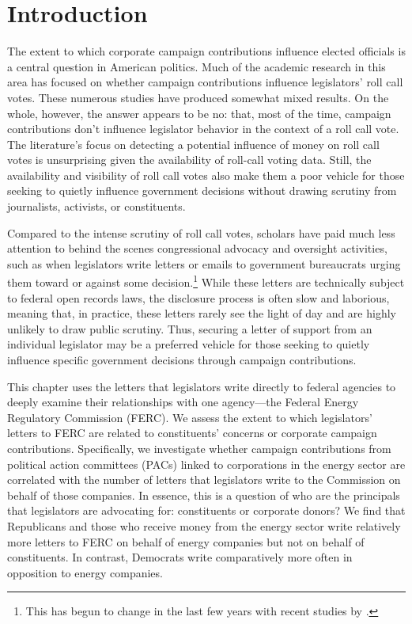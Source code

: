 \documentclass{article}
\begin{document}
\newpage
\doublespacing
\section{Introduction}

The extent to which corporate campaign contributions influence elected officials is a central question in American politics.  Much of the academic research in this area has focused on whether campaign contributions influence legislators' roll call votes.  These numerous studies have produced somewhat mixed results. On the whole, however, the answer appears to be no: that, most of the time, campaign contributions don't influence legislator behavior in the context of a roll call vote. The literature's focus on detecting a potential influence of money on roll call votes is unsurprising given the availability of roll-call voting data. Still, the availability and visibility of roll call votes also make them a poor vehicle for those seeking to quietly influence government decisions without drawing scrutiny from journalists, activists, or constituents. 

Compared to the intense scrutiny of roll call votes, scholars have paid much less attention to behind the scenes congressional advocacy and oversight activities, such as when legislators write letters or emails to government bureaucrats urging them toward or against some decision.\footnote{This has begun to change in the last few years with recent studies by  \citet{MillsKalafHuges2015, Ritchie2017, Lowande2018JOP, LowandeRitchieLauterbach2018, JudgeLordGrimmerPowell2018}.} While these letters are technically subject to federal open records laws, the disclosure process is often slow and laborious, meaning that, in practice, these letters rarely see the light of day and are highly unlikely to draw public scrutiny. Thus, securing a letter of support from an individual legislator may be a preferred vehicle for those seeking to quietly influence specific government decisions through campaign contributions.  

This chapter uses the letters that legislators write directly to federal agencies to deeply examine their relationships with one agency---the Federal Energy Regulatory Commission (FERC).  We assess the extent to which legislators' letters to FERC are related to constituents' concerns or corporate campaign contributions. Specifically, we investigate whether campaign contributions from political action committees (PACs) linked to corporations in the energy sector are correlated with the number of letters that legislators write to the Commission on behalf of those companies. In essence, this is a question of who are the principals that legislators are advocating for: constituents or corporate donors? We find that Republicans and those who receive money from the energy sector write relatively more letters to FERC on behalf of energy companies but not on behalf of constituents. In contrast, Democrats write comparatively more often in opposition to energy companies. 
\end{document}
